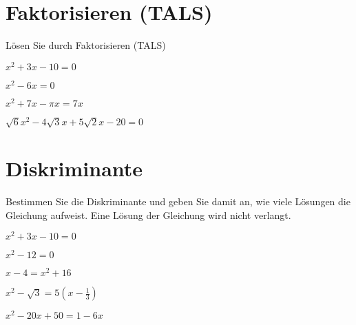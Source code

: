 \section{Faktorisieren (TALS)}
Lösen Sie durch Faktorisieren (TALS)

\begin{bbwAufgabenBlock}
\item $ x^2 + 3x - 10= 0$

\item $ x^2 - 6x= 0$

\item $ x^2 + 7x -\pi x= 7x$

\item $ \sqrt{6}x^2 - 4\sqrt{3}x + 5\sqrt{2}x - 20= 0$


\end{bbwAufgabenBlock}
\newpage



\section{Diskriminante}
Bestimmen Sie die Diskriminante und geben Sie damit an, wie viele
Lösungen die Gleichung aufweist. Eine Lösung der Gleichung wird nicht
verlangt.


\begin{bbwAufgabenBlock}
\item $ x^2 + 3x - 10= 0$

\item $ x^2 - 12= 0$

\item $ x-4= x^2 + 16$

\item $ x^2 - \sqrt{3} = 5(x-\frac13)$

\item $ x^2 - 20x + 50 = 1 - 6x$




\end{bbwAufgabenBlock}
\newpage



